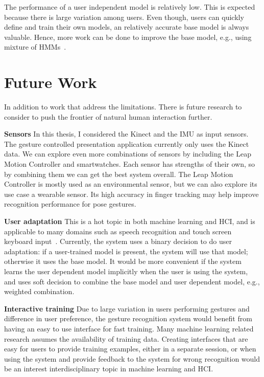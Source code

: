 The performance of a user independent model is relatively low. This is expected
because there is large variation among users. Even though, users can
quickly define and train their own models, an relatively accurate base
model is always valuable. Hence, more work can be done to improve the base
model, e.g., using mixture of HMMs~\cite{keskin12}.

\section{Future Work}
In addition to work that address the limitations. There is future research to
consider to push the frontier of natural human interaction further.

\textbf{Sensors} In this thesis, I considered the Kinect and the IMU as
input sensors. The gesture controlled presentation application currently
only uses the Kinect data. We can explore even more combinations of sensors
by including the Leap Motion Controller and smartwatches. Each sensor has
strengths of their own, so by combining them we can get the best system
overall. The Leap Motion Controller is mostly used as an environmental sensor,
but we can also explore its use case a wearable sensor. Its high accuracy in
finger tracking may help improve recognition performance for pose gestures.

\textbf{User adaptation} This is a hot topic in both machine learning and
HCI, and is applicable to many domains such as speech recognition and
touch screen keyboard input~\cite{yin13-making}. Currently, the system
uses a binary decision to do user adaptation: if a user-trained model is
present, the system will use that model; otherwise it uses the base
model. It would be more convenient if the system learns the user
dependent model implicitly when the user is using the system, and uses
soft decision to combine the base model and user dependent model, e.g., weighted
combination.

\textbf{Interactive training} Due to large variation in users performing
gestures and difference in user preference, the gesture recognition system would
benefit from having an easy to use interface for fast training. Many machine
learning related research assumes the availability of training data. Creating
interfaces that are easy for users to provide training examples, either in a
separate session, or when using the system and provide feedback to the system
for wrong recognition would be an interest interdisciplinary topic in machine
learning and HCI.
